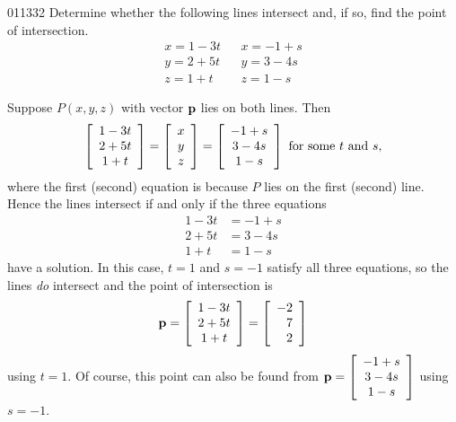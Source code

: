 \begin{example}{}{011332}
Determine whether the following lines intersect and, if so, find the point of intersection.
\begin{equation*}
\begin{array}{lcl}
x = 1 - 3t & & x = -1 + s\\
y = 2 + 5t & & y = 3 - 4s\\
z = 1 + t  & & z = 1 -s
\end{array}
\end{equation*}
\begin{solution}
  Suppose $P(x, y, z)$ with vector $\textbf{p}$ lies on both lines. Then
 \begin{equation*}
\left[
\begin{array}{c}
1 - 3t \\
2 + 5t \\
1 + t  
\end{array}
\right]
=
\left[
\begin{array}{c}
x \\
y \\
z  
\end{array}
\right]
=
\left[
\begin{array}{c}
-1 + s \\
3 - 4s \\
1 - s  
\end{array}
\right]
\mbox{ for some } t \mbox{ and } s,
\end{equation*}
where the first (second) equation is because $P$ lies on the first (second) line. Hence the lines intersect if and only if the three equations
\begin{align*}
1 - 3t & = -1 + s\\
2 + 5t & = 3 - 4s\\
1 + t  & = 1 -s
\end{align*}
have a solution. In this case, $t = 1$ and $s = -1$ satisfy all three equations, so the lines \textit{do} intersect and the point of intersection is
\begin{equation*}
\textbf{p} = \left[
\begin{array}{c}
1 - 3t \\
2 + 5t \\
1 + t  
\end{array}
\right]
=
\left[
\begin{array}{r}
-2 \\
7 \\
2  
\end{array}
\right]
\end{equation*}
using $t = 1$. Of course, this point can also be found from 
$\textbf{p} = \left[
\begin{array}{c}
	-1 + s \\
	3 - 4s \\
	1 - s 
\end{array}
\right]$
 using $s = -1$.
\end{solution}
\end{example}

